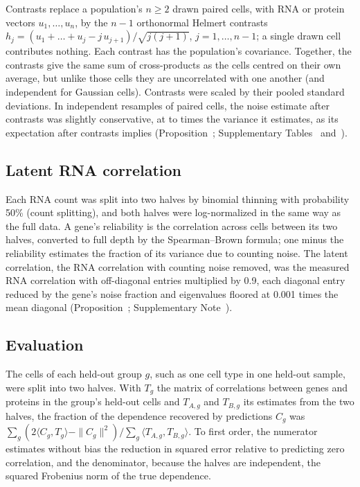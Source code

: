 \documentclass[pdflatex,sn-vancouver-num,iicol]{sn-jnl}
\begin{document}
Contrasts replace a population's $n\ge2$ drawn paired cells, with RNA or protein vectors $u_1,\dots,u_n$, by the $n-1$ orthonormal Helmert contrasts $h_j=(u_1+\dots+u_j-j\,u_{j+1})/\sqrt{j(j+1)}$, $j=1,\dots,n-1$; a single drawn cell contributes nothing. Each contrast has the population's covariance. Together, the contrasts give the same sum of cross-products as the cells centred on their own average, but unlike those cells they are uncorrelated with one another (and independent for Gaussian cells). Contrasts were scaled by their pooled standard deviations. In independent resamples of paired cells, the noise estimate after contrasts was slightly conservative, at \RvCalBmMin{} to \RvCalBmMax{} times the variance it estimates, as its expectation after contrasts implies (Proposition~; Supplementary Tables~ and~).

\subsection{Latent RNA correlation}
Each RNA count was split into two halves by binomial thinning with probability 50\% (count splitting\cite{batson2019,neufeld2024count}), and both halves were log-normalized in the same way as the full data. A gene's reliability is the correlation across cells between its two halves, converted to full depth by the Spearman--Brown formula\cite{spearman1910,brown1910}; one minus the reliability estimates the fraction of its variance due to counting noise. The latent correlation, the RNA correlation with counting noise removed, was the measured RNA correlation with off-diagonal entries multiplied by 0.9, each diagonal entry reduced by the gene's noise fraction\cite{spearman1904} and eigenvalues floored at 0.001 times the mean diagonal (Proposition~; Supplementary Note~).

\subsection{Evaluation}
The cells of each held-out group $g$, such as one cell type in one held-out sample, were split into two halves. With $T_g$ the matrix of correlations between genes and proteins in the group's held-out cells and $T_{A,g}$ and $T_{B,g}$ its estimates from the two halves, the fraction of the dependence recovered by predictions $C_g$ was $\sum_g(2\langle C_g,T_g\rangle-\|C_g\|^2)/\sum_g\langle T_{A,g},T_{B,g}\rangle$. To first order, the numerator estimates without bias the reduction in squared error relative to predicting zero correlation, and the denominator, because the halves are independent, the squared Frobenius norm of the true dependence.
\end{document}
